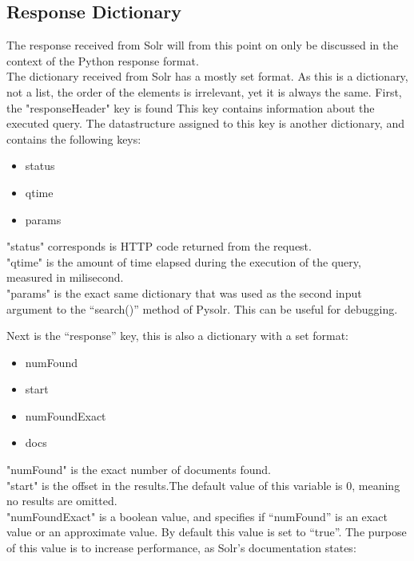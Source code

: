 \documentclass[a4paper,english]{report}
\begin{document}
\subsection{Response Dictionary}

The response received from Solr will from this point on only be discussed in the context of the Python response format.\\

The dictionary received from Solr has a mostly set format. As this is a dictionary, not a list, the order of the elements is irrelevant, yet it is always the same. First, the "responseHeader" key is found This key contains information about the executed query. The datastructure assigned to this key is another dictionary, and contains the following keys:\\

\begin{itemize}

\item status
\item qtime
\item params 


\end{itemize}


\noindent "status" corresponds is HTTP code returned from the request.\\ 
"qtime" is the amount of time elapsed during the execution of the query, measured in milisecond.\\
"params" is the exact same dictionary that was used as the second input argument to the “search()” method of Pysolr. This can be useful for debugging.

Next is the “response” key, this is also a dictionary with a set format:

\begin{itemize}

\item  numFound
\item start
\item numFoundExact
\item docs 

\end{itemize}


"numFound" is the exact number of documents found.\\ 
"start" is the offset in the results.The default value of this variable is 0, meaning no results are omitted.\\
"numFoundExact" is a boolean value, and specifies if “numFound” is an exact value or an approximate value. By default this value is set to “true”. The purpose of this value is to increase performance, as Solr’s documentation states:\\
\end{document}

